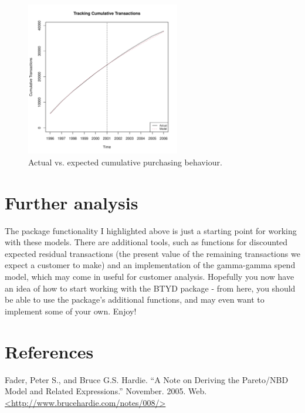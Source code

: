 \documentclass[10pt, letterpaper, onecolumn, oneside, final]{article}\usepackage[]{graphicx}\usepackage[]{color}
\begin{document}
\begin{figure}
  \begin{center}
  \includegraphics[width=0.6\textwidth]{figure/bgbbTrackingCum}
  \caption{Actual vs. expected cumulative purchasing behaviour.}\label{fig:bgbbTrackingCum}
  \end{center}
\end{figure}

\section{Further analysis}

The package functionality I highlighted above is just a starting point
for working with these models. There are additional tools, such as
functions for discounted expected residual transactions (the present
value of the remaining transactions we expect a customer to make) and
an implementation of the gamma-gamma spend model, which may come in
useful for customer analysis. Hopefully you now have an idea of how to
start working with the BTYD package - from here, you should be able to
use the package's additional functions, and may even want to implement
some of your own. Enjoy!

\clearpage

\section*{References}

\setlength{\parindent}{0pt} \setlength{\parskip}{1ex plus 0.2ex minus 0.2ex}

Fader, Peter S., and Bruce G.S. Hardie. ``A Note on Deriving the Pareto/NBD Model and Related Expressions.''
November. 2005. Web.\\ \href{http://www.brucehardie.com/notes/008/}{\textless http://www.brucehardie.com/notes/008/\textgreater}
\end{document}

